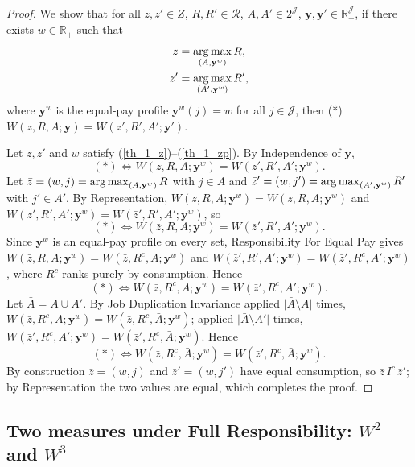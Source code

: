 \begin{proof}
We show that for all $z,z'\in Z$, $R,R'\in\mathcal R$, $A,A'\in 2^{\mathcal J}$,
$\mathbf y,\mathbf y'\in\mathbb R_+^{\mathcal J}$, if there exists
$w\in\mathbb R_+$ such that
\begin{align}
z&=\operatorname*{arg\,max}_{(A,\mathbf y^w)}R, \label{th_1_z}\\
z'&=\operatorname*{arg\,max}_{(A',\mathbf y^w)}R', \label{th_1_zp}
\end{align}
where $\mathbf y^w$ is the equal-pay profile $\mathbf y^w(j)=w$ for all
$j\in\mathcal J$, then (*) $W(z,R,A;\mathbf y)=W(z',R',A';\mathbf y')$.

Let $z,z'$ and $w$ satisfy (\ref{th_1_z})--(\ref{th_1_zp}). By Independence of
$\mathbf y$,
\begin{equation*}
(*)\Leftrightarrow W(z,R,A;\mathbf y^w)=W(z',R',A';\mathbf y^w).
\end{equation*}
Let $\bar z=(w,j)=\operatorname*{arg\,max}_{(A,\mathbf y^w)}R$ with $j\in A$ and
$\bar z'=(w,j')=\operatorname*{arg\,max}_{(A',\mathbf y^w)}R'$ with $j'\in A'$. By
Representation, $W(z,R,A;\mathbf y^w)=W(\bar z,R,A;\mathbf y^w)$ and
$W(z',R',A';\mathbf y^w)=W(\bar z',R',A';\mathbf y^w)$, so
\begin{equation*}
(*)\Leftrightarrow W(\bar z,R,A;\mathbf y^w)=W(\bar z',R',A';\mathbf y^w).
\end{equation*}
Since $\mathbf y^w$ is an equal-pay profile on every set, Responsibility For
Equal Pay gives $W(\bar z,R,A;\mathbf y^w)=W(\bar z,R^c,A;\mathbf y^w)$ and
$W(\bar z',R',A';\mathbf y^w)=W(\bar z',R^c,A';\mathbf y^w)$, where $R^c$ ranks
purely by consumption. Hence
\begin{equation*}
(*)\Leftrightarrow W(\bar z,R^c,A;\mathbf y^w)=W(\bar z',R^c,A';\mathbf y^w).
\end{equation*}
Let $\bar A=A\cup A'$. By Job Duplication Invariance applied
$\lvert\bar A\setminus A\rvert$ times,
$W(\bar z,R^c,A;\mathbf y^w)=W(\bar z,R^c,\bar A;\mathbf y^w)$; applied
$\lvert\bar A\setminus A'\rvert$ times,
$W(\bar z',R^c,A';\mathbf y^w)=W(\bar z',R^c,\bar A;\mathbf y^w)$. Hence
\begin{equation*}
(*)\Leftrightarrow W(\bar z,R^c,\bar A;\mathbf y^w)=W(\bar z',R^c,\bar
A;\mathbf y^w).
\end{equation*}
By construction $\bar z=(w,j)$ and $\bar z'=(w,j')$ have equal consumption, so
$\bar z\,I^c\,\bar z'$; by Representation the two values are equal, which
completes the proof.
\end{proof}

\subsection{Two measures under Full Responsibility: $W^2$ and $W^3$}


